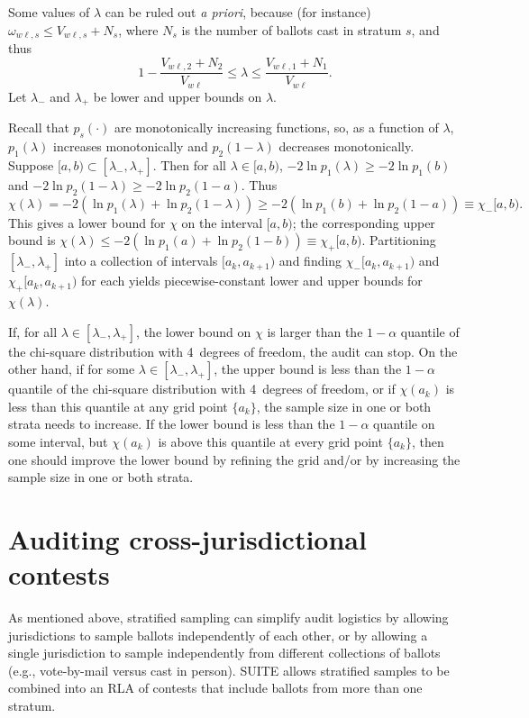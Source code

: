 \documentclass[runningheads]{llncs}
\newcommand{\beq}{\begin{equation}}
\newcommand{\eeq}{\end{equation}}
\begin{document}
Some values of $\lambda$ can be ruled out \emph{a priori}, because (for instance) $\omega_{w\ell,s} \le V_{w\ell,s}+N_s$, where $N_s$ is the number of ballots cast in stratum $s$, and thus
\beq
   1 - \frac{V_{w\ell,2}+N_2}{V_{w\ell}} \le \lambda \le \frac{V_{w\ell,1}+N_1}{V_{w\ell}}.
\eeq
Let $\lambda_-$ and $\lambda_+$ be lower and upper bounds on $\lambda$.

Recall that $p_s(\cdot)$ are monotonically increasing functions, so, as a function of $\lambda$, $p_1(\lambda)$ increases monotonically and $p_2(1-\lambda)$ decreases monotonically.
Suppose $[a, b) \subset [\lambda_-, \lambda_+]$.
Then for all $\lambda \in [a, b)$, $-2\ln p_1(\lambda) \ge -2\ln p_1(b)$ and
$-2\ln p_2(1-\lambda) \ge -2\ln p_2(1-a)$.
Thus
\beq\label{eq:lowerbound}
   \chi(\lambda) = -2(\ln p_1(\lambda)+ \ln p_2(1-\lambda))
          \ge -2(\ln p_1(b) + \ln p_2(1-a)) \equiv \chi_-[a,b).
\eeq
This gives a lower bound for $\chi$ on the interval $[a, b)$; the corresponding 
upper bound is $\chi(\lambda) \le -2(\ln p_1(a) + \ln p_2(1-b)) \equiv \chi_+[a,b)$.
Partitioning $[\lambda_-, \lambda_+]$ into a collection of intervals $[a_k, a_{k+1})$
and finding $\chi_-[a_k, a_{k+1})$ and $\chi_+[a_k, a_{k+1})$ for each
yields piecewise-constant lower and upper bounds for $\chi(\lambda)$.

If, for all $\lambda \in [\lambda_-, \lambda_+]$, the lower bound on $\chi$
is larger than the $1-\alpha$ quantile of the chi-square distribution with 4~degrees of freedom,
the audit can stop.
On the other hand, if for some $\lambda \in [\lambda_-, \lambda_+]$, 
the upper bound is less than the $1-\alpha$ quantile of the chi-square distribution with 4~degrees of freedom, 
or if $\chi(a_k)$ is less than this quantile at any grid point $\{a_k\}$,
the sample size in one or both strata needs to increase.
If the lower bound is less than the $1-\alpha$ quantile on some interval,
but $\chi(a_k)$ is above this quantile at every grid point $\{a_k\}$, then one should improve the lower bound by refining the grid and/or by increasing the sample size in one or both strata.

\section{Auditing cross-jurisdictional contests}\label{sec:combiningMethods}
As mentioned above, stratified sampling can simplify audit logistics by allowing jurisdictions
to sample ballots independently of each other, or by allowing a single jurisdiction to sample 
independently from different collections of ballots (e.g., vote-by-mail versus cast in person).
SUITE allows stratified samples to be combined into an RLA of contests that include ballots from more
than one stratum.
\end{document}
